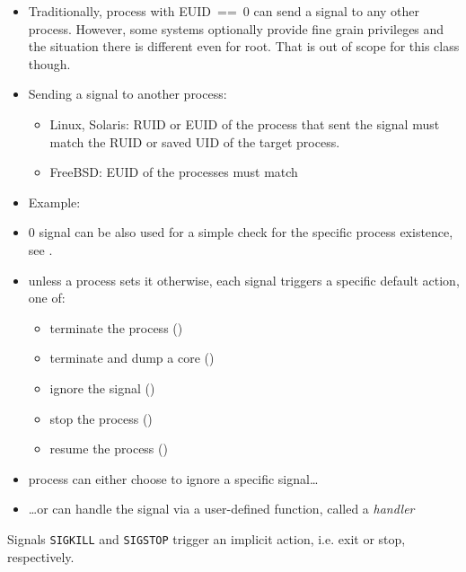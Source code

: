 \label{KILLSYSCALL}

\begin{itemize}
\item Traditionally, process with EUID~==~0 can send a signal to any other
process.  However, some systems optionally provide fine grain privileges and the
situation there is different even for root.  That is out of scope for this class
though.  \item Sending a signal to another process:
    \begin{itemize}
    \item Linux, Solaris: RUID or EUID of the process that sent the signal must
    match the RUID or saved UID of the target process.
    \item FreeBSD: EUID of the processes must match
    \end{itemize}
\item Example: 
\item 0 signal can be also used for a simple check for the specific process
existence, see .
\end{itemize}



\begin{slide}
\begin{itemize}
\item unless a process sets it otherwise, each signal triggers a specific
default action, one of:
    \begin{itemize}
    \item terminate the process ()
    \item terminate and dump a core ()
    \item ignore the signal ()
    \item stop the process ()
    \item resume the process ()
    \end{itemize}
\item process can either choose to ignore a specific signal\dots
\item \dots{}or can handle the signal via a user-defined function,
called a \emph{handler}
\end{itemize}

Signals \texttt{SIGKILL} and \texttt{SIGSTOP}  trigger an implicit
action, i.e. exit or stop, respectively.
\end{slide}

